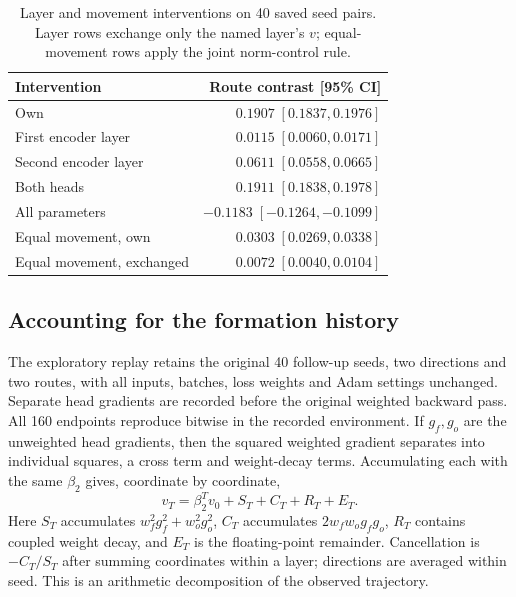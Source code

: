 \begin{table}[t]
\centering\small
\caption{Layer and movement interventions on 40 saved seed pairs. Layer rows exchange only the named layer's $v$; equal-movement rows apply the joint norm-control rule.}
\label{tab:ivfmechanism}
\begin{tabular}{lr}
\toprule
Intervention & Route contrast [95\% CI]\\
\midrule
Own & $0.1907\;[0.1837,0.1976]$ \\
First encoder layer & $0.0115\;[0.0060,0.0171]$ \\
Second encoder layer & $0.0611\;[0.0558,0.0665]$ \\
Both heads & $0.1911\;[0.1838,0.1978]$ \\
All parameters & $-0.1183\;[-0.1264,-0.1099]$ \\
Equal movement, own & $0.0303\;[0.0269,0.0338]$ \\
Equal movement, exchanged & $0.0072\;[0.0040,0.0104]$ \\
\bottomrule
\end{tabular}

\end{table}

\subsection{Accounting for the formation history}
\label{app:formationlogs}
\label{app:headgrad}
The exploratory replay retains the original 40 follow-up seeds, two directions and two routes, with all inputs, batches, loss weights and Adam settings unchanged. Separate head gradients are recorded before the original weighted backward pass. All 160 endpoints reproduce bitwise in the recorded environment. If $g_f,g_o$ are the unweighted head gradients, then the squared weighted gradient separates into individual squares, a cross term and weight-decay terms. Accumulating each with the same $\beta_2$ gives, coordinate by coordinate,
\begin{equation}v_T=\beta_2^T v_0+S_T+C_T+R_T+E_T.\end{equation}
Here $S_T$ accumulates $w_f^2g_f^2+w_o^2g_o^2$, $C_T$ accumulates $2w_fw_og_fg_o$, $R_T$ contains coupled weight decay, and $E_T$ is the floating-point remainder. Cancellation is $-C_T/S_T$ after summing coordinates within a layer; directions are averaged within seed. This is an arithmetic decomposition of the observed trajectory.

